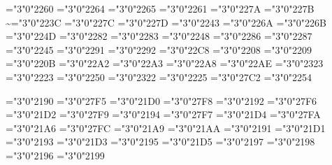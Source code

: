 \Umathchardef\neq="3"0"2260       %
\Umathchardef\leq="3"0"2264       %
\Umathchardef\geq="3"0"2265       %
\Umathchardef\equiv="3"0"2261     %
\Umathchardef\prec="3"0"227A      %
\Umathchardef\succ="3"0"227B      %
\Umathchardef\sim="3"0"223C       %
\Umathchardef\preceq="3"0"227C    %
\Umathchardef\succeq="3"0"227D    %
\Umathchardef\simeq="3"0"2243     %
\Umathchardef\ll="3"0"226A        %
\Umathchardef\gg="3"0"226B        %
\Umathchardef\asymp="3"0"224D     %
\Umathchardef\subset="3"0"2282    %
\Umathchardef\supset="3"0"2283    %
\Umathchardef\approx="3"0"2248    %
\Umathchardef\subseteq="3"0"2286  %
\Umathchardef\supseteq="3"0"2287  %
\Umathchardef\cong="3"0"2245      %
\Umathchardef\sqsubseteq="3"0"2291 %
\Umathchardef\sqsupseteq="3"0"2292 %
\Umathchardef\bowtie="3"0"22C8    %
\Umathchardef\in="3"0"2208        %
\Umathchardef\notin="3"0"2209     %
\Umathchardef\ni="3"0"220B        %
\Umathchardef\vdash="3"0"22A2     %
\Umathchardef\dashv="3"0"22A3     %
\Umathchardef\models="3"0"22A8    %
\Umathchardef\nmodels="3"0"22AE   %
\Umathchardef\smile="3"0"2323     %
\Umathchardef\mid="3"0"2223       %
\Umathchardef\doteq="3"0"2250     %
\Umathchardef\frown="3"0"2322     %
\Umathchardef\parallet="3"0"2225  %
\Umathchardef\perp="3"0"27C2      %
\Umathchardef\coleq="3"0"2254     %

\Umathchardef\leftarrow="3"0"2190
\Umathchardef\longleftarrow="3"0"27F5
\Umathchardef\Leftarrow="3"0"21D0
\Umathchardef\Longleftarrow="3"0"27F8
\Umathchardef\rightarrow="3"0"2192
\Umathchardef\longrightarrow="3"0"27F6
\Umathchardef\Rightarrow="3"0"21D2
\Umathchardef\Longrightarrow="3"0"27F9
\Umathchardef\leftrightarrow="3"0"2194
\Umathchardef\longleftrightarrow="3"0"27F7
\Umathchardef\Leftrightarrow="3"0"21D4
\Umathchardef\Longleftrightarrow="3"0"27FA
\Umathchardef\mapsto="3"0"21A6
\Umathchardef\longmapsto="3"0"27FC
\Umathchardef\hookleftarrow="3"0"21A9
\Umathchardef\hookrightarrow="3"0"21AA
\Umathchardef\uparrow="3"0"2191
\Umathchardef\Uparrow="3"0"21D1
\Umathchardef\downarrow="3"0"2193
\Umathchardef\Downarrow="3"0"21D3
\Umathchardef\updownarrow="3"0"2195
\Umathchardef\Updownarrow="3"0"21D5
\Umathchardef\nearrow="3"0"2197
\Umathchardef\searrow="3"0"2198
\Umathchardef\nwarrow="3"0"2196
\Umathchardef\swarrow="3"0"2199

